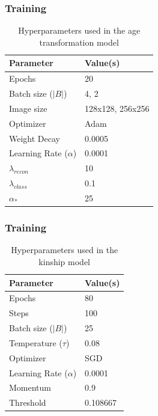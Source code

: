 \documentclass[aspectratio=169]{beamer}
\begin{document}
\begin{frame}
\frametitle{Training}

\begin{table}[ht]
    \centering
    \begin{tabular}{ll}
        \hline
        \textbf{Parameter} & \textbf{Value(s)} \\
        \hline
        Epochs & 20 \\
        Batch size ($|B|$) & 4, 2 \\
        Image size & 128x128, 256x256 \\
        Optimizer & Adam \\
        Weight Decay & 0.0005 \\
        Learning Rate ($\alpha$) & 0.0001 \\
        $\lambda_{recon}$ & 10 \\
        $\lambda_{class}$ & 0.1 \\
        $\alpha_*$ & 25 \\
        \hline
    \end{tabular}
    \caption{Hyperparameters used in the age transformation model}
    \label{tab:agetrans_hyperparameters}
\end{table}

\end{frame}


\begin{frame}
\frametitle{Training}

\begin{table}[ht]
    \centering
    \begin{tabular}{ll}
        \hline
        \textbf{Parameter} & \textbf{Value(s)} \\
        \hline
        Epochs & 80 \\
        Steps & 100 \\
        Batch size ($|B|$) & 25 \\
        Temperature ($\tau$) & 0.08 \\
        Optimizer & SGD \\
        Learning Rate ($\alpha$) & 0.0001 \\
        Momentum & 0.9 \\
        Threshold & 0.108667 \\
        \hline
    \end{tabular}
    \caption{Hyperparameters used in the kinship model}
    \label{tab:kinship_hyperparameters}
\end{table}

\end{frame}
\end{document}
